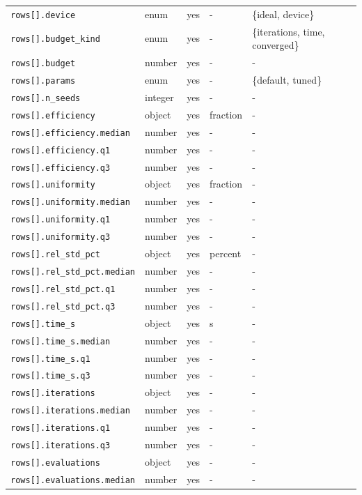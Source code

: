 \begin{longtable}{@{}l l c l l@{}}
\texttt{rows[].device} & enum & yes & - & \{ideal, device\}\\
\texttt{rows[].budget\_kind} & enum & yes & - & \{iterations, time, converged\}\\
\texttt{rows[].budget} & number & yes & - & -\\
\texttt{rows[].params} & enum & yes & - & \{default, tuned\}\\
\texttt{rows[].n\_seeds} & integer & yes & - & -\\
\texttt{rows[].efficiency} & object & yes & fraction & -\\
\texttt{rows[].efficiency.median} & number & yes & - & -\\
\texttt{rows[].efficiency.q1} & number & yes & - & -\\
\texttt{rows[].efficiency.q3} & number & yes & - & -\\
\texttt{rows[].uniformity} & object & yes & fraction & -\\
\texttt{rows[].uniformity.median} & number & yes & - & -\\
\texttt{rows[].uniformity.q1} & number & yes & - & -\\
\texttt{rows[].uniformity.q3} & number & yes & - & -\\
\texttt{rows[].rel\_std\_pct} & object & yes & percent & -\\
\texttt{rows[].rel\_std\_pct.median} & number & yes & - & -\\
\texttt{rows[].rel\_std\_pct.q1} & number & yes & - & -\\
\texttt{rows[].rel\_std\_pct.q3} & number & yes & - & -\\
\texttt{rows[].time\_s} & object & yes & s & -\\
\texttt{rows[].time\_s.median} & number & yes & - & -\\
\texttt{rows[].time\_s.q1} & number & yes & - & -\\
\texttt{rows[].time\_s.q3} & number & yes & - & -\\
\texttt{rows[].iterations} & object & yes & - & -\\
\texttt{rows[].iterations.median} & number & yes & - & -\\
\texttt{rows[].iterations.q1} & number & yes & - & -\\
\texttt{rows[].iterations.q3} & number & yes & - & -\\
\texttt{rows[].evaluations} & object & yes & - & -\\
\texttt{rows[].evaluations.median} & number & yes & - & -\\

\end{longtable}
